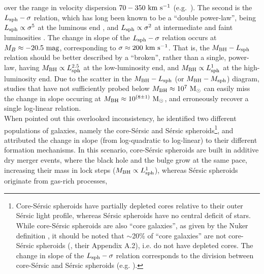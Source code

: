 \documentclass[preprint2]{emulateapj}
\begin{document}
over the range in velocity dispersion $70-350~\rm km~s^{-1}$ (e.g.~\citealt{graham2011,mcconnell2011,grahamscott2013}).
The second is the $L_{\rm sph} - \sigma$ relation, 
which has long been known to be a ``double power-law'', 
being $L_{\rm sph} \propto \sigma^5$ at the luminous end \citep{schechter1980,malumuthkrishner1981,vonderlinden2007,liu2008}, 
and $L_{\rm sph} \propto \sigma^2$ at intermediate and faint luminosities 
\citep{davies1983,held1992,matkovicguzman2005,derijcke2005,balcells2007screl,chilingarian2008,forbes2008,cody2009,tortora2009,kourkchi2012}. 
The change in slope of the $L_{\rm sph} - \sigma$ relation occurs at $M_B \approx -20.5\rm~mag$, 
corresponding to $\sigma \approx 200~\rm km~s^{-1}$. 
That is, the $M_{\rm BH} - L_{\rm sph}$ relation should be better described by a ``broken'', rather than a single, power-law, 
having $M_{\rm BH} \propto L_{\rm sph}^{2.5}$ at the low-luminosity end, 
and $M_{\rm BH} \propto L_{\rm sph}^1$ at the high-luminosity end.  
Due to the scatter in the $M_{\rm BH} - L_{\rm sph}$ (or $M_{\rm BH} - M_{\rm sph}$) diagram, 
studies that have not sufficiently probed below $M_{\rm BH} \approx 10^7\rm~M_\odot$ 
can easily miss the change in slope occuring at $M_{\rm BH} \approx 10^{(8 \pm 1)}\rm~M_\odot$, 
and erroneously recover a single log-linear relation. \\
When \cite{graham2012bent} pointed out this overlooked inconsistency, 
he identified two different populations of galaxies, 
namely the core-S\'ersic \citep{graham2003coresersicmodel,trujillo2004coresersicmodel} and S\'ersic 
spheroids\footnote{Core-S\'ersic spheroids have partially depleted cores relative to their outer S\'ersic light profile, 
whereas S\'ersic spheroids have no central deficit of stars. 
While core-S\'ersic spheroids are also ``core galaxies'', as given by the Nuker definition \citep{lauer2007lumell},
it should be noted that $\sim$20\% of ``core galaxies'' are not core-S\'ersic spheroids 
(\citealt{dullograham2014cores}, their Appendix A.2), i.e. do not have depleted cores.
The change in slope of the $L_{\rm sph} - \sigma$ relation corresponds to the division between 
core-S\'ersic and S\'ersic spheroids (e.g. \citealt{grahamguzman2003}).},
and attributed the change in slope (from log-quadratic to log-linear) to their different formation mechanisms. 
In this scenario, core-S\'ersic spheroids are built in additive dry merger events, 
where the black hole and the bulge grow at the same pace, increasing their mass in lock steps ($M_{\rm BH} \propto L_{\rm sph}^1$), 
whereas S\'ersic spheroids originate from gas-rich processes, 
\end{document}
